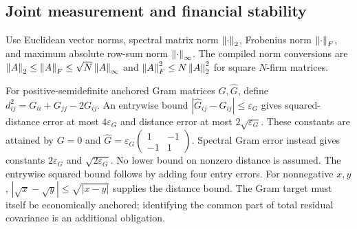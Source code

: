 \documentclass[11pt]{article}
\renewcommand{\lean}[1]{\ignorespaces}
\renewcommand{\leanok}{\ignorespaces}
\begin{document}
\subsection{Joint measurement and financial stability}\label{app:network}
Use Euclidean vector norms, spectral matrix norm $\left\lVert\cdot\right\rVert_2$, Frobenius
norm $\left\lVert\cdot\right\rVert_F$, and maximum absolute row-sum norm
$\left\lVert\cdot\right\rVert_\infty$. The compiled norm conversions are
$\left\lVert A\right\rVert_2\le\left\lVert A\right\rVert_F\le\sqrt N\left\lVert A\right\rVert_\infty$ and
$\left\lVert A\right\rVert_F^2\le N\left\lVert A\right\rVert_2^2$ for square $N$-firm matrices.
\lean{FreeFoundations.MatrixBounds.spectralNorm_le_frobeniusNorm,
  FreeFoundations.MatrixBounds.frobeniusNorm_le_sqrt_card_mul_rowSumNorm,
FreeFoundations.MatrixBounds.frobeniusNorm_sq_le_card_mul_spectralNorm_sq}\leanok{}

For positive-semidefinite anchored Gram matrices $G,\widehat G$, define
$d_{ij}^2=G_{ii}+G_{jj}-2G_{ij}$. An entrywise bound
$|\widehat G_{ij}-G_{ij}|\le\varepsilon_G$ gives squared-distance error at most
$4\varepsilon_G$ and distance error at most $2\sqrt{\varepsilon_G}$.
These constants are attained by $G=0$ and
$\widehat G=\varepsilon_G\left(
  \begin{smallmatrix}1&-1\\-1&1
\end{smallmatrix}\right)$.
Spectral Gram error instead gives constants $2\varepsilon_G$ and
$\sqrt{2\varepsilon_G}$. No lower bound on nonzero distance is assumed.
\lean{FreeFoundations.GramDistance.distance_error,
  FreeFoundations.GramDistance.distance_error_spectral,
FreeFoundations.GramDistance.sharpGram_distance}\leanok{}
The entrywise squared bound follows by adding four entry errors. For
nonnegative $x,y$, $|\sqrt x-\sqrt y|\le\sqrt{|x-y|}$ supplies the
distance bound.
The Gram target must itself be economically anchored; identifying the common
part of total residual covariance is an additional obligation.
\end{document}
